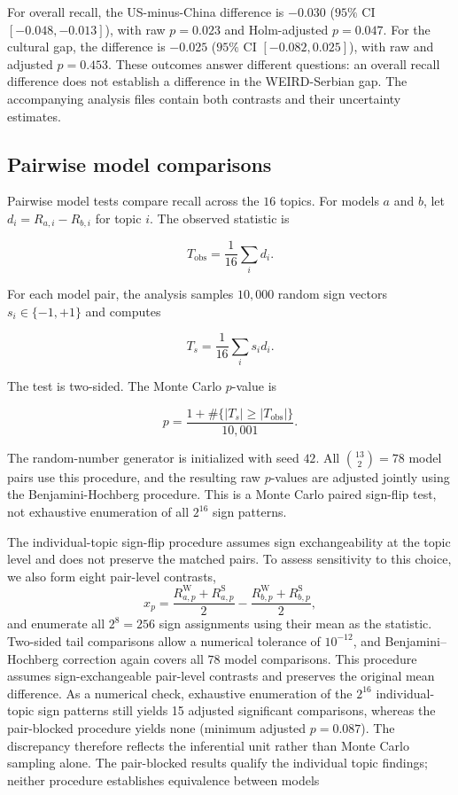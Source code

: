 \documentclass[11pt,a4paper]{article}
\begin{document}
For overall recall, the US-minus-China difference is $-0.030$ ($95\%$ CI $[-0.048,-0.013]$), with raw $p=0.023$ and Holm-adjusted $p=0.047$. For the cultural gap, the difference is $-0.025$ ($95\%$ CI $[-0.082,0.025]$), with raw and adjusted $p=0.453$. These outcomes answer different questions: an overall recall difference does not establish a difference in the WEIRD-Serbian gap. The accompanying analysis files contain both contrasts and their uncertainty estimates.

\subsection{Pairwise model comparisons}
\label{app:model_pair_tests}

Pairwise model tests compare recall across the $16$ topics. For models $a$ and $b$, let $d_i=R_{a,i}-R_{b,i}$ for topic $i$. The observed statistic is

\begin{equation}
 T_{\mathrm{obs}}=\frac{1}{16}\sum_i d_i.
\end{equation}

For each model pair, the analysis samples $10,000$ random sign vectors $s_i\in\{-1,+1\}$ and computes

\begin{equation}
 T_s=\frac{1}{16}\sum_i s_i d_i.
\end{equation}

The test is two-sided. The Monte Carlo $p$-value is

\begin{equation}
 p=\frac{1+\#\{|T_s|\geq|T_{\mathrm{obs}}|\}}{10{,}001}.
\end{equation}

The random-number generator is initialized with seed $42$. All $\binom{13}{2}=78$ model pairs use this procedure, and the resulting raw $p$-values are adjusted jointly using the Benjamini-Hochberg procedure. This is a Monte Carlo paired sign-flip test, not exhaustive enumeration of all $2^{16}$ sign patterns.

The individual-topic sign-flip procedure assumes sign exchangeability at the topic level and does not preserve the matched pairs. To assess sensitivity to this choice, we also form eight pair-level contrasts,
\[
x_p=\frac{R_{a,p}^{\mathrm W}+R_{a,p}^{\mathrm S}}{2}
-\frac{R_{b,p}^{\mathrm W}+R_{b,p}^{\mathrm S}}{2},
\]
and enumerate all $2^8=256$ sign assignments using their mean as the statistic. Two-sided tail comparisons allow a numerical tolerance of $10^{-12}$, and Benjamini--Hochberg correction again covers all $78$ model comparisons. This procedure assumes sign-exchangeable pair-level contrasts and preserves the original mean difference. As a numerical check, exhaustive enumeration of the $2^{16}$ individual-topic sign patterns still yields 15 adjusted significant comparisons, whereas the pair-blocked procedure yields none (minimum adjusted $p=0.087$). The discrepancy therefore reflects the inferential unit rather than Monte Carlo sampling alone. The pair-blocked results qualify the individual topic findings; neither procedure establishes equivalence between models
\end{document}

